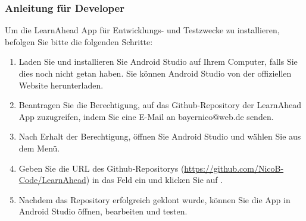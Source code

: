 \subsubsection{Anleitung für Developer}
Um die LearnAhead App für Entwicklungs- und Testzwecke zu installieren, befolgen Sie bitte die folgenden Schritte:\newline
\begin{enumerate}
    \item Laden Sie und installieren Sie Android Studio auf Ihrem Computer, falls Sie dies noch nicht getan haben. Sie können Android Studio von der offiziellen Website herunterladen.
    \item Beantragen Sie die Berechtigung, auf das Github-Repository der LearnAhead App zuzugreifen, indem Sie eine E-Mail an bayernico@web.de senden.
    \item Nach Erhalt der Berechtigung, öffnen Sie Android Studio und wählen Sie  aus dem  Menü.
    \item Geben Sie die URL des Github-Repositorys (\href{Uhttps://github.com/NicoB-Code/LearnAheadRL}{https://github.com/NicoB-Code/LearnAhead}) in das Feld  ein und klicken Sie auf .
    \item Nachdem das Repository erfolgreich geklont wurde, können Sie die App in Android Studio öffnen, bearbeiten und testen.
\end{enumerate}

